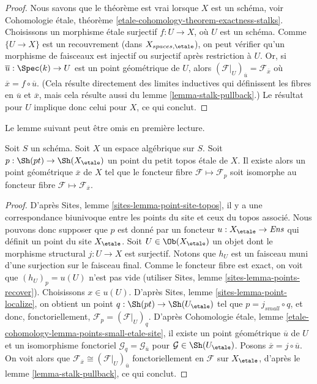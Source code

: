 \begin{proof}
Nous savons que le théorème est vrai lorsque $X$ est un schéma, voir
Cohomologie \'etale, théorème \ref{etale-cohomology-theorem-exactness-stalks}.
Choisissons un morphisme \'etale surjectif $f : U \to X$, où $U$ est un schéma.
Comme $\{U \to X\}$ est un recouvrement (dans $X_{spaces, \etale}$), on peut
vérifier qu'un morphisme de faisceaux est injectif ou surjectif après
restriction à $U$. Or, si $\overline{u} : \Spec(k) \to U$ est un point
géométrique de $U$, alors
$(\mathcal{F}|_U)_{\overline{u}} = \mathcal{F}_{\overline{x}}$
où $\overline{x} = f \circ \overline{u}$. (Cela résulte directement des
limites inductives qui définissent les fibres en $\overline{u}$ et $\overline{x}$, mais
cela résulte aussi du
lemme \ref{lemma-stalk-pullback}.)
Le résultat pour $U$ implique donc celui pour $X$, ce qui conclut.
\end{proof}

\noindent
Le lemme suivant peut être omis en première lecture.

\begin{lemma}
\label{lemma-points-small-etale-site}
Soit $S$ un schéma.
Soit $X$ un espace algébrique sur $S$.
Soit $p : \Sh(pt) \to \Sh(X_\etale)$
un point du petit topos \'etale de $X$.
Il existe alors un point géométrique $\overline{x}$ de $X$
tel que le foncteur fibre $\mathcal{F} \mapsto \mathcal{F}_p$
soit isomorphe au foncteur fibre
$\mathcal{F} \mapsto \mathcal{F}_{\overline{x}}$.
\end{lemma}

\begin{proof}
D'après
Sites, lemme \ref{sites-lemma-point-site-topos},
il y a une correspondance biunivoque entre les points du site et ceux
du topos associé. Nous pouvons donc supposer que $p$ est donné par
un foncteur $u : X_\etale \to \textit{Ens}$ qui définit un point
du site $X_\etale$.
Soit $U \in \Ob(X_\etale)$ un objet dont le morphisme structural
$j : U \to X$ est surjectif. Notons que $h_U$ est un faisceau
muni d'une surjection sur le faisceau final. Comme le foncteur fibre est exact,
on voit que $(h_U)_p = u(U)$ n'est pas vide (utiliser
Sites, lemme \ref{sites-lemma-points-recover}).
Choisissons $x \in u(U)$. D'après
Sites, lemme \ref{sites-lemma-point-localize},
on obtient un point $q : \Sh(pt) \to \Sh(U_\etale)$
tel que $p = j_{small} \circ q$, et donc, fonctoriellement,
$\mathcal{F}_p = (\mathcal{F}|_U)_q$.
D'après
Cohomologie \'etale, lemme \ref{etale-cohomology-lemma-points-small-etale-site},
il existe un point géométrique $\overline{u}$ de $U$ et un isomorphisme
fonctoriel $\mathcal{G}_q = \mathcal{G}_{\overline{u}}$
pour $\mathcal{G} \in \Sh(U_\etale)$. Posons
$\overline{x} = j \circ \overline{u}$. On voit alors que
$\mathcal{F}_{\overline{x}} \cong (\mathcal{F}|_U)_{\overline{u}}$
fonctoriellement en $\mathcal{F}$ sur $X_\etale$, d'après le
lemme \ref{lemma-stalk-pullback},
ce qui conclut.
\end{proof}





